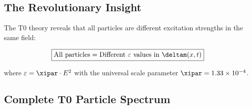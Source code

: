 	\subsection{The Revolutionary Insight}
	
	The T0 theory reveals that all particles are different excitation strengths in the same field:
	
	\begin{equation}
		\boxed{\text{All particles} = \text{Different } \varepsilon \text{ values in } \deltam(x,t)}
		\label{eq:universal_particle_principle}
	\end{equation}
	
	where $\varepsilon = \xipar \cdot E^2$ with the universal scale parameter $\xipar = 1.33 \times 10^{-4}$.
	
	\subsection{Complete T0 Particle Spectrum}
	
